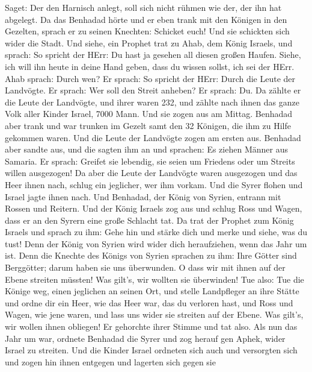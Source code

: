 Saget: Der den Harnisch anlegt, soll sich nicht rühmen wie der, der ihn
hat abgelegt.  Da das Benhadad hörte und er eben trank mit
den Königen in den Gezelten, sprach er zu seinen Knechten: Schicket
euch! Und sie schickten sich wider die Stadt.  Und siehe,
ein Prophet trat zu Ahab, dem König Israels, und sprach: So spricht der
HErr: Du hast ja gesehen all diesen großen Haufen. Siehe, ich will ihn
heute in deine Hand geben, dass du wissen sollst, ich sei der HErr.
 Ahab sprach: Durch wen? Er sprach: So spricht der HErr:
Durch die Leute der Landvögte. Er sprach: Wer soll den Streit anheben?
Er sprach: Du.  Da zählte er die Leute der Landvögte, und
ihrer waren 232, und zählte nach ihnen das ganze Volk aller Kinder
Israel, 7000 Mann.  Und sie zogen aus am Mittag. Benhadad
aber trank und war trunken im Gezelt samt den 32 Königen, die ihm zu
Hilfe gekommen waren.  Und die Leute der Landvögte zogen am
ersten aus. Benhadad aber sandte aus, und die sagten ihm an und
sprachen: Es ziehen Männer aus Samaria.  Er sprach: Greifet
sie lebendig, sie seien um Friedens oder um Streits willen ausgezogen!
 Da aber die Leute der Landvögte waren ausgezogen und das
Heer ihnen nach,  schlug ein jeglicher, wer ihm vorkam. Und
die Syrer flohen und Israel jagte ihnen nach. Und Benhadad, der König
von Syrien, entrann mit Rossen und Reitern.  Und der König
Israels zog aus und schlug Ross und Wagen, dass er an den Syrern eine
große Schlacht tat.  Da trat der Prophet zum König Israels
und sprach zu ihm: Gehe hin und stärke dich und merke und siehe, was du
tust! Denn der König von Syrien wird wider dich heraufziehen, wenn das
Jahr um ist.  Denn die Knechte des Königs von Syrien
sprachen zu ihm: Ihre Götter sind Berggötter; darum haben sie uns
überwunden. O dass wir mit ihnen auf der Ebene streiten müssten! Was
gilt's, wir wollten sie überwinden!  Tue also: Tue die
Könige weg, einen jeglichen an seinen Ort, und stelle Landpfleger an
ihre Stätte  und ordne dir ein Heer, wie das Heer war, das
du verloren hast, und Ross und Wagen, wie jene waren, und lass uns wider
sie streiten auf der Ebene. Was gilt's, wir wollen ihnen obliegen! Er
gehorchte ihrer Stimme und tat also.  Als nun das Jahr um
war, ordnete Benhadad die Syrer und zog herauf gen Aphek, wider Israel
zu streiten.  Und die Kinder Israel ordneten sich auch und
versorgten sich und zogen hin ihnen entgegen und lagerten sich gegen sie
